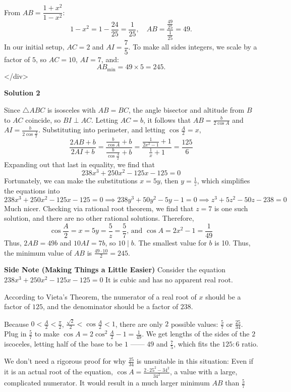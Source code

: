 \begin{enumerate}
 From \(AB = \dfrac{1 + x^2}{1 - x^2}\):
 \[1 - x^2 = 1 - \frac{24}{25} = \frac{1}{25}, \quad AB = \frac{\frac{49}{25}}{\frac{1}{25}} = 49.\]In our initial setup, \(AC = 2\) and \(AI = \dfrac{7}{5}\). To make all sides integers, we scale by a factor of \(5\), so \(AC = 10\), \(AI = 7\), and:
 \[AB_{\text{min}} = 49 \times 5 = \boxed{245}.\]
</div>



\textbf{Solution 2}

Since $\triangle ABC$ is isosceles with $AB = BC$, the angle bisector and altitude from $B$ to $AC$ coincide, so $BI \perp AC$. Letting $AC=b$, it follows that $AB = \frac{b}{2\cos A}$ and $AI=\frac{b}{2\cos \frac{A}{2}}$. Substituting into perimeter, and letting $\cos \frac{A}{2}=x$, 
 \[\dfrac{2AB+b}{2AI+b} = \dfrac{\frac{b}{\cos A}+b}{\frac{b}{\cos \frac{A}{2}}+b}=\dfrac{\frac{1}{2x^2-1}+1}{\frac{1}{x}+1}=\dfrac{125}{6}\] Expanding out that last in equality, we find that 
 \[238x^3+250x^2-125x-125=0\] Fortunately, we can make the substitutions $x = 5y$, then $y = \frac{1}{z}$, which simplifies the equations into 
 \[238x^3+250x^2-125x-125=0 \implies 238y^3+50y^2-5y-1=0 \implies z^3+5z^2-50z-238=0\] Much nicer. Checking via rational root theorem, we find that $z=7$ is one such solution, and there are no other rational solutions. Therefore, 
 \[\cos \frac{A}{2}= x = 5y = \frac{5}{z} = \frac{5}{7}\text{, and } \cos A = 2x^2-1 = \frac{1}{49}\] Thus, $2AB = 49b$ and $10AI = 7b$, so $10 \mid b$. The smallest value for $b$ is 10. Thus, the minimum value of $AB$ is $\frac{49\cdot 10}{2}=\boxed{245}$.

 \textbf{Side Note (Making Things a Little Easier)} Consider the equation $238x^3+250x^2-125x-125=0$  It is cubic and has no apparent real root.

 According to Vieta's Theorem, the numerator of a real root of $x$ should be a factor of $125$, and the denominator should be a factor of $238$.

 Because $0<\frac{A}{2}<\frac{\pi}{2}$, $\frac{\sqrt{2}}{2}<\cos{\frac{A}{2}}<1$, there are only $2$ possible values: $\frac{5}{7}$ or $\frac{25}{34}$. Plug in $\frac{5}{7}$ to make $\cos{A} = 2\cos^{2}{\frac{A}{2}} - 1 = \frac{1}{49}$. We get lengths of the sides of the $2$ iscoceles, letting half of the base to be $1$ —— $49$ and $\frac{7}{5}$, which fits the $125:6$ ratio.

 We don't need a rigorous proof for why $\frac{25}{34}$ is unsuitable in this situation: Even if it is an actual root of the equation, $\cos{A} = \frac{2\cdot25^2-34^2}{34^2}$, a value with a large, complicated numerator. It would result in a much larger minimum $AB$ than $\frac{5}{7}$


\end{enumerate}
